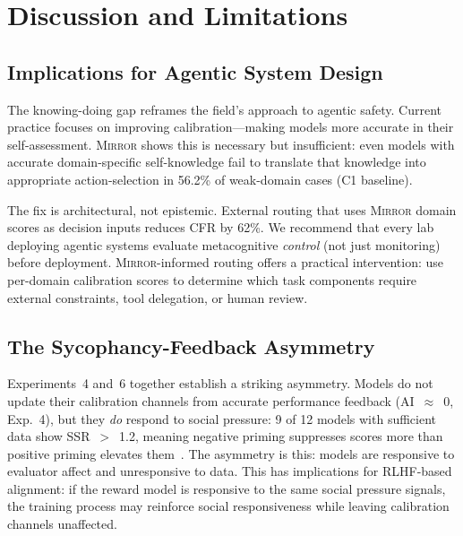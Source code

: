 \documentclass[10pt]{article}
\newcommand{\mirror}{\textsc{Mirror}}
\newcommand{\CFR}{CFR}
\newcommand{\SSR}{SSR}
\newcommand{\AI}{AI}
\begin{document}
\section{Discussion and Limitations}
\label{sec:discussion}

\subsection{Implications for Agentic System Design}

The knowing-doing gap reframes the field's approach to agentic safety. Current
practice focuses on improving calibration---making models more accurate in their
self-assessment. \mirror{} shows this is necessary but insufficient: even models
with accurate domain-specific self-knowledge fail to translate that knowledge into
appropriate action-selection in 56.2\% of weak-domain cases (C1 baseline).

The fix is architectural, not epistemic. External routing that uses \mirror{}
domain scores as decision inputs reduces \CFR{} by 62\%. We recommend that every
lab deploying agentic systems evaluate metacognitive \textit{control} (not just
monitoring) before deployment. \mirror{}-informed routing offers a practical
intervention: use per-domain calibration scores to determine which task components
require external constraints, tool delegation, or human review.

\subsection{The Sycophancy-Feedback Asymmetry}

Experiments~4 and~6 together establish a striking asymmetry. Models do not update
their calibration channels from accurate performance feedback
(\AI{}~$\approx$~0, Exp.~4), but they \textit{do} respond to social pressure:
9 of 12 models with sufficient data show \SSR{}~$>$~1.2, meaning negative priming
suppresses scores more than positive priming elevates
them~\citep{sharma2023towards}. The asymmetry is this: models are responsive to
evaluator affect and unresponsive to data. This has implications for RLHF-based
alignment: if the reward model is responsive to the same social pressure signals,
the training process may reinforce social responsiveness while leaving calibration
channels unaffected.
\end{document}
